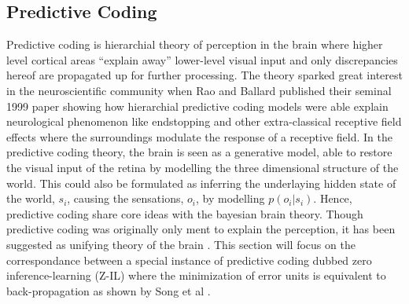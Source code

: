 \documentclass[a4paper,11pt]{article} %
\begin{document}
\subsection{Predictive Coding}
Predictive coding is hierarchial theory of perception in the brain where higher level cortical areas ``explain away'' lower-level visual input and only discrepancies hereof are propagated up for further processing. The theory sparked great interest in the neuroscientific community when Rao and Ballard published their seminal 1999 paper \cite{raoballard1999} showing how hierarchial predictive coding models were able explain neurological phenomenon like endstopping and other extra-classical receptive field effects where the surroundings modulate the response of a receptive field. In the predictive coding theory, the brain is seen as a generative model, able to restore the visual input of the retina by modelling the three dimensional structure of the world. This could also be formulated as inferring the underlaying hidden state of the world, $s_i$, causing the sensations, $o_i$, by modelling $p(o_i | s_i)$. Hence, predictive coding share core ideas with the bayesian brain theory. Though predictive coding was originally only ment to explain the perception, it has been suggested as unifying theory of the brain \cite{millidge2021predictive}. This section will focus on the correspondance between a special instance of predictive coding dubbed zero inference-learning (Z-IL) where the minimization of error units is equivalent to back-propagation as shown by Song et al \cite{PredictiveCodingNetworks}.
\end{document}
